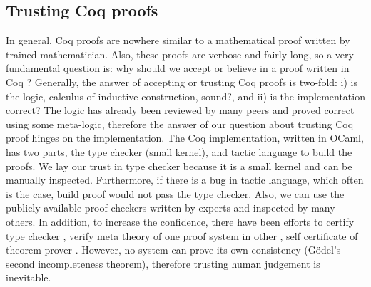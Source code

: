  \subsection{Trusting Coq proofs}
 \label{sec:coqproof}
  In general, Coq proofs are nowhere similar to a mathematical 
  proof written by trained mathematician. Also, these proofs 
  are verbose and fairly long, so a 
  very fundamental question is: why should we 
  accept or believe in a proof written in Coq \citep{pollack1998believe}?  Generally, the answer of 
	accepting or trusting Coq proofs is two-fold:
  i) is the logic, calculus of inductive construction, sound?, and ii) is the implementation correct?
  The logic has already been reviewed by many peers and proved correct 
  using some meta-logic, therefore the answer of our question about trusting Coq proof 
  hinges on the implementation. 
  The Coq implementation, written in OCaml,  has two parts, the type checker (small kernel), 
  and tactic language to build the proofs.
  We lay our trust in type checker because it is a small kernel and can be 
  manually inspected. Furthermore, if there
  is a bug in tactic language, which often is the case,  build proof would 
  not pass the type checker.  Also, we can use the publicly available proof 
  checkers written by experts and inspected by many others. In addition, to increase the 
  confidence, there have been 
  efforts to certify type checker \citep{Appel2003}
  \citep{barras1996coq}, verify meta theory of one proof system 
  in other \citep{10.1007/978-3-319-08970-6_3}, self certificate of 
  theorem prover \citep{10.1007/11814771_17}. However, no system can 
  prove its own consistency (G{\"o}del's second incompleteness theorem), therefore
  trusting human judgement is inevitable.
  
 
